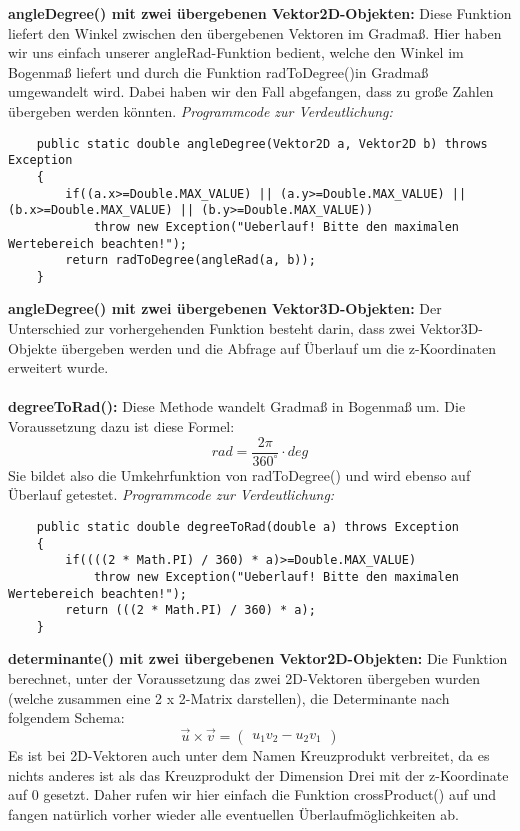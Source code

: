 \documentclass[a4paper,11pt]{scrartcl}
\begin{document}
\textbf{angleDegree() mit zwei übergebenen Vektor2D-Objekten:} Diese Funktion liefert den Winkel zwischen den übergebenen Vektoren im Gradmaß. Hier haben wir uns einfach unserer angleRad-Funktion bedient, welche den Winkel im Bogenmaß liefert und durch die Funktion radToDegree()in Gradmaß umgewandelt wird. Dabei haben wir den Fall abgefangen, dass zu große Zahlen übergeben werden könnten.
\textit{Programmcode zur Verdeutlichung:}
\begin{lstlisting}
	public static double angleDegree(Vektor2D a, Vektor2D b) throws Exception
	{
		if((a.x>=Double.MAX_VALUE) || (a.y>=Double.MAX_VALUE) || (b.x>=Double.MAX_VALUE) || (b.y>=Double.MAX_VALUE))
			throw new Exception("Ueberlauf! Bitte den maximalen Wertebereich beachten!");
		return radToDegree(angleRad(a, b));
	}
\end{lstlisting} $\;$ \\
\textbf{angleDegree() mit zwei übergebenen Vektor3D-Objekten:} Der Unterschied zur vorhergehenden Funktion besteht darin, dass zwei Vektor3D-Objekte übergeben werden und die Abfrage auf Überlauf um die z-Koordinaten erweitert wurde.\\
\\
\textbf{degreeToRad():} Diese Methode wandelt Gradmaß in Bogenmaß um. Die Voraussetzung dazu ist diese Formel:
\[ rad = \frac{2\pi}{360 ^\circ} \cdot deg \]
Sie bildet also die Umkehrfunktion von radToDegree() und wird ebenso auf Überlauf getestet.
\textit{Programmcode zur Verdeutlichung:}
\begin{lstlisting}
	public static double degreeToRad(double a) throws Exception
	{
		if((((2 * Math.PI) / 360) * a)>=Double.MAX_VALUE)
			throw new Exception("Ueberlauf! Bitte den maximalen Wertebereich beachten!");
		return (((2 * Math.PI) / 360) * a);
	}
\end{lstlisting} $\;$ \\
\textbf{determinante() mit zwei übergebenen Vektor2D-Objekten:} Die Funktion  berechnet, unter der Voraussetzung das zwei 2D-Vektoren übergeben wurden (welche zusammen eine 2 x 2-Matrix darstellen), die Determinante nach folgendem Schema:
\[ \vec u \times \vec v = \begin{pmatrix}
u_1v_2 - u_2v_1
\end{pmatrix}\]
Es ist bei 2D-Vektoren auch unter dem Namen Kreuzprodukt verbreitet, da es nichts anderes ist als das Kreuzprodukt der Dimension Drei mit der z-Koordinate auf 0 gesetzt. Daher rufen wir hier einfach die Funktion crossProduct() auf und fangen natürlich vorher wieder alle eventuellen Überlaufmöglichkeiten ab.\\
\end{document}
